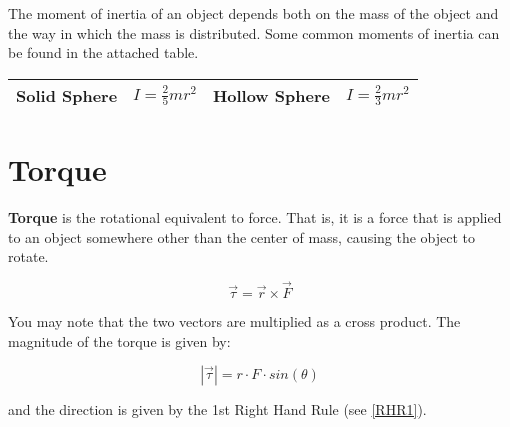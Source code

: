 	The moment of inertia of an object depends both on the mass of the object and the way in which the mass is distributed.  Some common moments of inertia can be found in the attached table.  
	
	\begin{longtable}{|c c|c c |}
		\hline
		Solid Sphere & $I=\frac{2}{5}mr^2$ & Hollow Sphere & $I = \frac{2}{3} m r^2 $  \\	
		\hline
		
	\end{longtable}
	
	
	
	\section{Torque}
	\textbf{Torque} is the rotational equivalent to force.  That is, it is a force that is applied to an object somewhere other than the center of mass, causing the object to rotate.  
	
	
		\begin{mdframed}[backgroundcolor=orange!20!white]
		\begin{equation}
			\vec{\tau} = \vec{r} \times \vec{F}
			\label{equation:torque}
		\end{equation}
	\end{mdframed}
	
	
	You may note that the two vectors are multiplied as a cross product.  The magnitude of the torque is given by:
	
		\begin{mdframed}[backgroundcolor=orange!20!white]
		\begin{equation}
			|\vec{\tau}| = r \cdot F \cdot sin (\theta)
			\label{equation:torquemagnitude}
		\end{equation}
	\end{mdframed}
	
	and the direction is given by the 1st Right Hand Rule (see \cref{RHR1}).
	
